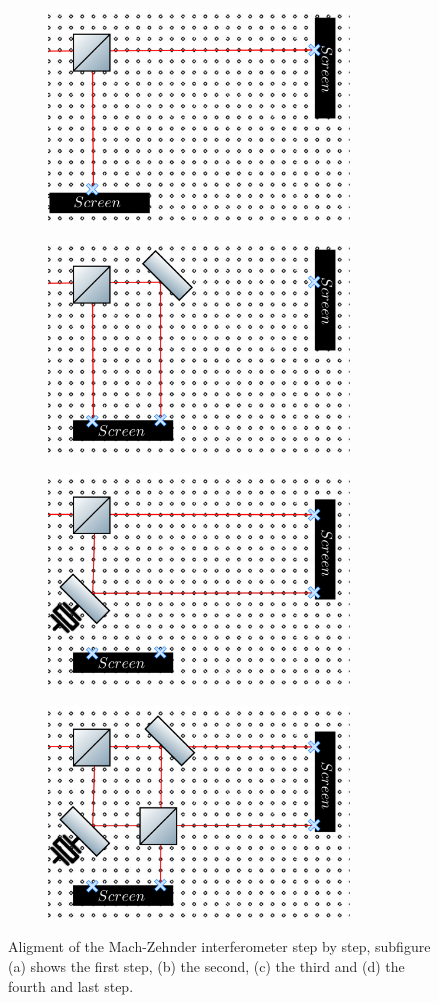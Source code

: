 \documentclass[12pt]{book}
\begin{document}
\begin{figure}[t!]
\centering
\begin{subfigure}[b]{0.55\linewidth}
\includegraphics[width=8cm,height=4 cm]{images/first_step.png}
\caption{}
\label{fig:BS1}
\end{subfigure}
\begin{subfigure}[b]{0.55\linewidth}
\includegraphics[width=8cm,height=4 cm]{images/second_step.png}
\caption{}
\label{fig:BS1}
\end{subfigure}
\begin{subfigure}[b]{0.55\linewidth}
\includegraphics[width=8cm,height=4 cm]{images/third_step.png}
\caption{}
\label{fig:BS1}
\end{subfigure}
\begin{subfigure}[b]{0.55\linewidth}
\includegraphics[width=8cm,height=4 cm]{images/last_step.png}
\caption{}
\label{fig:westminster_aerea}
\end{subfigure}
\caption{Aligment of the Mach-Zehnder interferometer step by step, subfigure (a) shows the first step, (b) the second, (c) the third and (d) the fourth and last step.}
\label{steps}
\end{figure}
\end{document}
